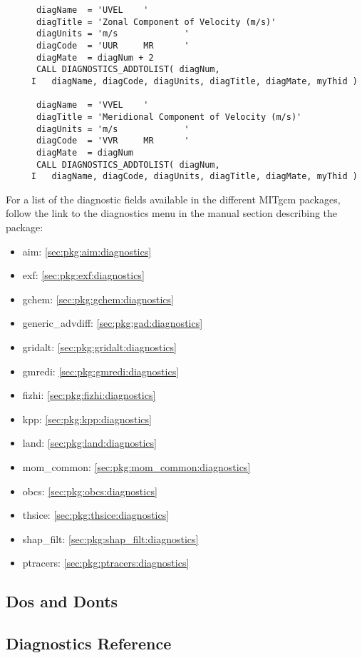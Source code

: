 \begin{verbatim}
      diagName  = 'UVEL    '
      diagTitle = 'Zonal Component of Velocity (m/s)'
      diagUnits = 'm/s             '
      diagCode  = 'UUR     MR      '
      diagMate  = diagNum + 2
      CALL DIAGNOSTICS_ADDTOLIST( diagNum,
     I   diagName, diagCode, diagUnits, diagTitle, diagMate, myThid )

      diagName  = 'VVEL    '
      diagTitle = 'Meridional Component of Velocity (m/s)'
      diagUnits = 'm/s             '
      diagCode  = 'VVR     MR      '
      diagMate  = diagNum
      CALL DIAGNOSTICS_ADDTOLIST( diagNum,
     I   diagName, diagCode, diagUnits, diagTitle, diagMate, myThid )
\end{verbatim}



\newpage
\noindent For a list of the diagnostic fields available in the
different MITgcm packages, follow the link to the diagnostics menu
in the manual section describing the package:

\begin{itemize}
\item aim: \ref{sec:pkg:aim:diagnostics}
\item exf: \ref{sec:pkg:exf:diagnostics}
\item gchem: \ref{sec:pkg:gchem:diagnostics}
\item generic\_advdiff: \ref{sec:pkg:gad:diagnostics}
\item gridalt: \ref{sec:pkg:gridalt:diagnostics}
\item gmredi: \ref{sec:pkg:gmredi:diagnostics}
\item fizhi: \ref{sec:pkg:fizhi:diagnostics}
\item kpp: \ref{sec:pkg:kpp:diagnostics}
\item land: \ref{sec:pkg:land:diagnostics}
\item mom\_common: \ref{sec:pkg:mom_common:diagnostics}
\item obcs: \ref{sec:pkg:obcs:diagnostics}
\item thsice: \ref{sec:pkg:thsice:diagnostics}
\item shap\_filt: \ref{sec:pkg:shap_filt:diagnostics}
\item ptracers: \ref{sec:pkg:ptracers:diagnostics}
\end{itemize}

\subsection{Dos and Donts}

\subsection{Diagnostics Reference}

